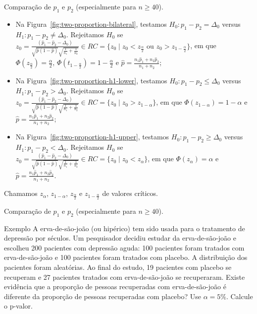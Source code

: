 \documentclass[9pt]{beamer}
\begin{document}
\begin{frame}{Comparação de $p_1$ e $p_2$ (especialmente para $n \geq 40$).}

\begin{itemize}
	\item Na Figura~\ref{fig:two-proportion-bilateral}, testamos $H_0: p_1 - p_2 = \Delta_0$ versus $H_1: p_1 - p_2 \neq \Delta_0$. Rejeitamos $H_0$ se $z_0 = \frac{(\hat{p}_1 - \hat{p}_2 - \Delta_0)}{\sqrt{\hat{p}(1 - \hat{p})}\sqrt{\frac{1}{n_1} + \frac{1}{n_2}}} \in  RC=\{z_0 \mid z_0 < z_{\frac{\alpha}{2}} \allowbreak \mbox{ ou } z_0 > z_{1-\frac{\alpha}{2}} \}$, em que $\Phi\left( z_{\frac{\alpha}{2}} \right) = \frac{\alpha}{2}$, $\Phi\left(t_{1-\frac{\alpha}{2}} \right) = 1 - \frac{\alpha}{2}$ e $ \hat{p} = \frac{n_1 \hat{p}_1 + n_2 \hat{p}_2}{n_1 + n_2}$;
	\vfill
	
	\item Na Figura~\ref{fig:two-proportion-h1-lower}, testamos $H_0: p_1 - p_2 \leq \Delta_0 $ versus $H_1: p_1 - p_2 > \Delta_0$. Rejeitamos $H_0$ se $z_0 = \frac{(\hat{p}_1 - \hat{p}_2 - \Delta_0)}{\sqrt{\hat{p}(1 - \hat{p})}\sqrt{\frac{1}{n_1} + \frac{1}{n_2}}} \in \allowbreak RC=\{z_0 \mid z_0 > z_{1-\alpha}  \}$, em que $\Phi\left(z_{1-\alpha} \right) =1- \alpha$ e $ \hat{p} = \frac{n_1 \hat{p}_1 + n_2 \hat{p}_2}{n_1 + n_2}$;
	\vfill
	
	\item Na Figura~\ref{fig:two-proportion-h1-upper}, testamos $H_0: p_1 - p_2 \geq \Delta_0$ versus $H_1: p_1 - p_2  < \Delta_0$. Rejeitamos $H_0$ se $z_0 = \frac{(\hat{p}_1 - \hat{p}_2 - \Delta_0)}{\sqrt{\hat{p}(1 - \hat{p})}\sqrt{\frac{1}{n_1} + \frac{1}{n_2}}} \in \allowbreak RC=\{z_0 \mid z_0 < z_{\alpha}  \}$, em que $\Phi\left( z_{\alpha} \right) = \alpha$ e $ \hat{p} = \frac{n_1 \hat{p}_1 + n_2 \hat{p}_2}{n_1 + n_2}$.
\end{itemize}
Chamamos $z_\alpha$, $z_{1-\alpha}$, $z_\frac{\alpha}{2}$ e $z_{1-\frac{\alpha}{2}}$ de valores críticos.
\end{frame}

\begin{frame}{Comparação de $p_1$ e $p_2$ (especialmente para $n \geq 40$).}

\large
\begin{block}{Exemplo}
	A erva-de-são-joão (ou hipérico) tem sido usada para o tratamento de depressão por séculos. Um pesquisador decidiu estudar da erva-de-são-joão e escolheu 200 pacientes com depressão aguda: 100 pacientes foram tratados com erva-de-são-joão e 100 pacientes foram tratados com placebo. A distribuição dos pacientes foram aleatórias. Ao final do estudo, 19 pacientes com placebo se recuperam e 27 pacientes tratados com erva-de-são-joão se recuperaram. Existe evidência que a proporção de pessoas recuperadas com  erva-de-são-joão é diferente da proporção de pessoas recuperadas com placebo? Use $\alpha=5\%$. Calcule o p-valor.
\end{block}
\normalsize

\end{frame}
\end{document}
